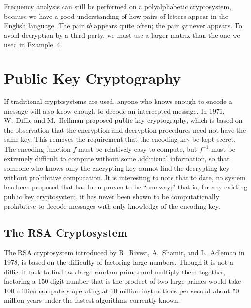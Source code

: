  
\medskip
 
 
Frequency analysis can still be performed on a polyalphabetic
cryptosystem, because we have a good understanding of how pairs of
letters appear in the English language. The pair {\em th} appears
quite often; the pair {\em qz} never appears.  To avoid decryption by
a third party, we must use a larger matrix than the one we used in
Example~4. 
  
 
 
\section{Public Key Cryptography}
 
 
 
If traditional cryptosystems are used, anyone who knows enough to
encode a message will also know enough to decode an intercepted
message. In 1976, W.~Diffie and
M.~Hellman proposed public key cryptography, which
is based on the observation that the encryption and decryption
procedures need not have the same key. This removes the requirement
that the encoding key be kept secret. The encoding function $f$ must
be relatively easy to compute, but $f^{-1}$ must be extremely
difficult to compute without some additional information, so that
someone who knows only the encrypting key cannot find the decrypting
key without prohibitive computation. It is interesting to note that to
date, no system has been proposed that has been proven to be
``one-way;'' that is, for any existing public key cryptosystem, it has
never been shown to be computationally prohibitive to decode messages
with only knowledge of the encoding key. 
 
 
 
\subsection*{The RSA Cryptosystem}
 
The RSA cryptosystem introduced by R.~Rivest,
A.~Shamir, and L.~Adleman in
1978, is based on the difficulty of factoring large numbers. Though it
is not a difficult task to find two large random primes and multiply
them together, factoring a 150-digit number that is the product of two
large primes would take 100 million computers operating at 10 million
instructions per second about 50 million years under the fastest
algorithms currently known.
 

